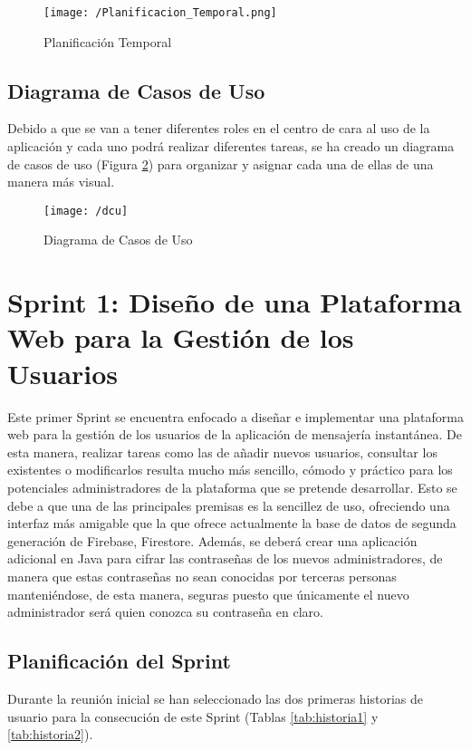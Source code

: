 \begin{figure}[!h]
	\begin{center}
		\texttt{[image: /Planificacion\_Temporal.png]}
		\caption{Planificación Temporal}
		\label{fig:plantempo}
	\end{center}
\end{figure}

\clearpage

\subsection{Diagrama de Casos de Uso}
Debido a que se van a tener diferentes roles en el centro de cara al uso de la aplicación y cada uno podrá realizar diferentes tareas, se ha creado un diagrama de casos de uso (Figura \ref{fig:dcu}) para organizar y asignar cada una de ellas de una manera más visual.

\begin{figure}[!h]
	\begin{center}
		\texttt{[image: /dcu]}
		\caption{Diagrama de Casos de Uso}
		\label{fig:dcu}
	\end{center}
\end{figure}

\clearpage

\section{Sprint 1: Diseño de una Plataforma Web para la Gestión de los Usuarios}
Este primer Sprint se encuentra enfocado a diseñar e implementar una plataforma web para la gestión de los usuarios de la aplicación de mensajería instantánea. De esta manera, realizar tareas como las de añadir nuevos usuarios, consultar los existentes o modificarlos resulta mucho más sencillo, cómodo y práctico para los potenciales administradores de la plataforma que se pretende desarrollar. Esto se debe a que una de las principales premisas es la sencillez de uso, ofreciendo una interfaz más amigable que la que ofrece actualmente la base de datos de segunda generación de Firebase, Firestore. Además, se deberá crear una aplicación adicional en Java para cifrar las contraseñas de los nuevos administradores, de manera que estas contraseñas no sean conocidas por terceras personas manteniéndose, de esta manera, seguras puesto que únicamente el nuevo administrador será quien conozca su contraseña en claro.

\subsection{Planificación del Sprint}
Durante la reunión inicial se han seleccionado las dos primeras historias de usuario para la consecución de este Sprint (Tablas \ref{tab:historia1} y \ref{tab:historia2}).

